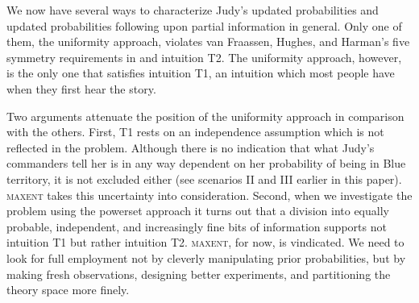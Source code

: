 We now have several ways to characterize Judy's updated
probabilities and updated probabilities following upon partial
information in general. Only one of them, the uniformity approach,
violates van Fraassen, Hughes, and Harman's five symmetry requirements
in  and intuition T2. The uniformity
approach, however, is the only one that satisfies intuition T1, an
intuition which most people have when they first hear the story. 

Two arguments attenuate the position of the uniformity approach in
comparison with the others. First, T1 rests on an independence
assumption which is not reflected in the problem. Although there is no
indication that what Judy's commanders tell her is in any way
dependent on her probability of being in Blue territory, it is not
excluded either (see scenarios II and III earlier in this paper).
\textsc{maxent} takes this uncertainty into consideration. Second,
when we investigate the problem using the powerset approach it turns
out that a division into equally probable, independent, and
increasingly fine bits of information supports not intuition T1 but
rather intuition T2. \textsc{maxent}, for now, is vindicated. We need
to look for full employment not by cleverly manipulating prior
probabilities, but by making fresh observations, designing better
experiments, and partitioning the theory space more finely.